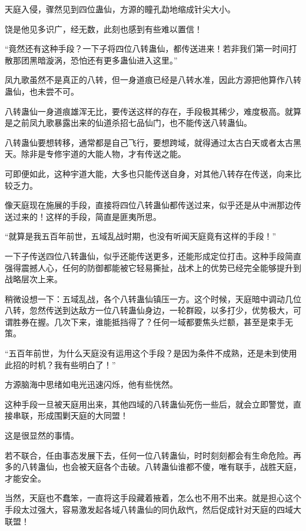
\begin{this_body}

天庭入侵，骤然见到四位蛊仙，方源的瞳孔勐地缩成针尖大小。

饶是他见多识广，经无数，此刻也感到有些难以置信！

“竟然还有这种手段？一下子将四位八转蛊仙，都传送进来！若非我们第一时间打散那团黑暗漩涡，恐怕还有更多蛊仙进入这里。”

凤九歌虽然不是真正的八转，但一身道痕已经是八转水准，因此方源把他算作八转蛊仙，也未尝不可。

八转蛊仙一身道痕雄浑无比，要传送这样的存在，手段极其稀少，难度极高。就算是之前凤九歌暴露出来的仙道杀招七品仙门，也不能传送八转蛊仙。

八转蛊仙要想转移，通常都是自己飞行，要想跨域，就得通过太古白天或者太古黑天。除非是专修宇道的大能人物，才有传送之能。

可即便如此，这种宇道大能，大多也只能传送自身，对其他八转存在传送，向来比较乏力。

像天庭现在施展的手段，直接将四位八转蛊仙都传送过来，似乎还是从中洲那边传送过来的！这样的手段，简直是匪夷所思。

“就算是我五百年前世，五域乱战时期，也没有听闻天庭竟有这样的手段！”

一下子传送四位八转蛊仙，似乎还能传送更多，还能形成定位打击。这种手段简直强得震撼人心，任何的防御都能被它轻易撕扯，战术上的优势已经完全能够提升到战略层次上来。

稍微设想一下：五域乱战，各个八转蛊仙镇压一方。这个时候，天庭暗中调动几位八转，忽然传送到达敌方一位八转蛊仙身边，一轮群殴，以多打少，优势极大，可谓胜券在握。几次下来，谁能抵挡得了？任何一域都要焦头烂额，甚至是束手无策。

“五百年前世，为什么天庭没有运用这个手段？是因为条件不成熟，还是未到使用此招的时机？我有些明白了！”

方源脑海中思绪如电光迅速闪烁，他有些恍然。

这种手段一旦被天庭用出来，其他四域的八转蛊仙死伤一些后，就会立即警觉，直接串联，形成围剿天庭的大同盟！

这是很显然的事情。

若不联合，任由事态发展下去，任何一位八转蛊仙，时时刻刻都会有生命危险。再多的八转蛊仙，也会被天庭各个击破。八转蛊仙谁都不傻，唯有联手，战胜天庭，才能安全。

当然，天庭也不蠢笨，一直将这手段藏着掖着，怎么也不用不出来。就是担心这个手段太过强大，容易激发起各域八转蛊仙的同仇敌忾，然后促成针对天庭的四域大联盟！


\end{this_body}
